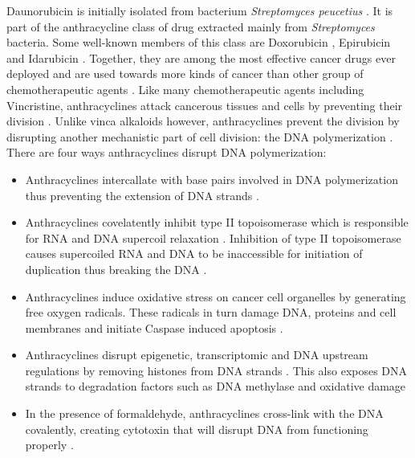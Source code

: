 \documentclass[pdftex,12pt,a4paper]{report}
\begin{document}
Daunorubicin is initially isolated from bacterium \textit{Streptomyces peucetius} \cite{otten1990cloning, lin2011chiral}. It is part of the anthracycline class of drug \cite{gewirtz1999critical} extracted mainly from \textit{Streptomyces} bacteria. Some well-known members of this class are Doxorubicin \cite{nci2018defdoxorubicin}, Epirubicin \cite{nci2018defepirubicin} and Idarubicin \cite{nci2018defidarubicin}. Together, they are among the most effective cancer drugs ever deployed and are used towards more kinds of cancer than other group of chemotherapeutic agents \cite{weiss1992anthracyclines, minotti2004anthracyclines, peng2005cardiotoxicology}. Like many chemotherapeutic agents including Vincristine, anthracyclines attack cancerous tissues and cells by preventing their division \cite{drugs2018defdaunorubicin}. Unlike vinca alkaloids however, anthracyclines prevent the division by disrupting another mechanistic part of cell division: the DNA polymerization \cite{gewirtz1999critical}. There are four ways anthracyclines disrupt DNA polymerization:

\begin{itemize}
\item Anthracyclines intercallate with base pairs involved in DNA polymerization thus preventing the extension of DNA strands \cite{takimoto2008principles}.

\item Anthracyclines covelatently inhibit type II topoisomerase which is responsible for RNA and DNA supercoil relaxation \cite{wang2002cellular}. Inhibition of type II topoisomerase causes supercoiled RNA and DNA to be inaccessible for initiation of duplication thus breaking the DNA \cite{tewey1984adriamycin}.

\item Anthracyclines induce oxidative stress on cancer cell organelles by generating free oxygen radicals. These radicals in turn damage DNA, proteins and cell membranes and initiate Caspase induced apoptosis \cite{vsimuunek2009anthracycline, halliwell1994free}.

\item Anthracyclines disrupt epigenetic, transcriptomic and DNA upstream regulations by removing histones from DNA strands \cite{pang2013drug}. This also exposes DNA strands to degradation factors such as DNA methylase \cite{vaissiere2008epigenetic} and oxidative damage \cite{ljungman1992efficient}

\item In the presence of formaldehyde, anthracyclines cross-link with the DNA covalently, creating cytotoxin that will disrupt DNA from functioning properly \cite{wang1991formaldehyde}.
\end{itemize}
\end{document}
